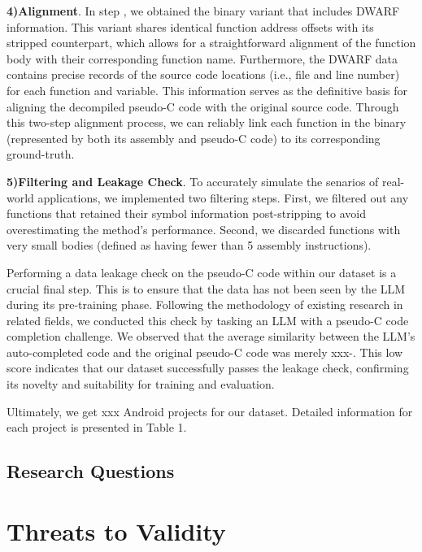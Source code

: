 \documentclass[acmsmall,screen,review,anonymous]{acmart} %
\begin{document}
\textbf{4)Alignment}. In step , we obtained the binary variant that includes DWARF information. This variant shares identical function address offsets with its stripped counterpart, which allows for a straightforward alignment of the function body with their corresponding function name. Furthermore, the DWARF data contains precise records of the source code locations (i.e., file and line number) for each function and variable. This information serves as the definitive basis for aligning the decompiled pseudo-C code with the original source code. Through this two-step alignment process, we can reliably link each function in the binary (represented by both its assembly and pseudo-C code) to its corresponding ground-truth.


\textbf{5)Filtering and Leakage Check}. To accurately simulate the senarios of real-world applications, we implemented two filtering steps. First, we filtered out any functions that retained their symbol information post-stripping to avoid overestimating the method's performance. Second, we discarded functions with very small bodies (defined as having fewer than 5 assembly instructions).

Performing a data leakage check on the pseudo-C code within our dataset is a crucial final step. This is to ensure that the data has not been seen by the LLM during its pre-training phase. Following the methodology of existing research in related fields, we conducted this check by tasking an LLM with a pseudo-C code completion challenge. We observed that the average similarity between the LLM's auto-completed code and the original pseudo-C code was merely xxx-. This low score indicates that our dataset successfully passes the leakage check, confirming its novelty and suitability for training and evaluation.

Ultimately, we get xxx Android projects for our dataset. Detailed information for each project is presented in Table 1.



\subsection{Research Questions}



\section{Threats to Validity}
\end{document}
